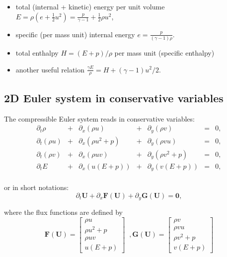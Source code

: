 \documentclass{article}
\begin{document}
\begin{itemize}
\item total (internal + kinetic) energy per unit volume $E = \rho \left( e + \frac{1}{2} u^2 \right) = \frac{p}{\gamma-1} + \frac{1}{2} \rho u^2$,
\item specific (per mass unit) internal energy $e=\frac{p}{(\gamma-1)\rho}$.
\item total enthalpy $H = (E + p)/\rho$ per mass unit (specific enthalpy)
\item another useful relation $\frac{\gamma E}{\rho}=H+(\gamma-1)u^2/2$.
\end{itemize}


\subsection*{2D Euler system in conservative variables}
The compressible Euler system reads in conservative variables:\\
\begin{equation}
  \begin{array}{ccccccc}
    \partial_t \rho & + & \partial_x(\rho u) & + & \partial_y(\rho v) & = & 0,\\
    \partial_t (\rho u) & + & \partial_x(\rho u^2+p) & + & \partial_y(\rho v u) & = & 0,\\
    \partial_t (\rho v) & + & \partial_x(\rho u v) & + & \partial_y(\rho v^2+p) & = & 0,\\
    \partial_t E & + & \partial_x (u(E+p)) & + & \partial_y (v(E+p)) & = & 0,\\
  \end{array}
\end{equation}

or in short notations:
\begin{equation*}
  \partial_t \mathbf{U} + \partial_x \mathbf{F(U)} + \partial_y \mathbf{G(U)} = \mathbf{0},
\end{equation*}

where the flux functions are defined by
\begin{equation}
  \mathbf{F(U)} = \left [
  \begin{array}{c}
    \rho u \\
    \rho u^2 + p \\
    \rho u v \\
    u (E + p)
  \end{array} \right]
  \;\; ,
  \mathbf{G(U)} = \left [
  \begin{array}{c}
    \rho v \\
    \rho v u \\
    \rho v^2 + p \\
    v (E + p)
  \end{array} \right]
\end{equation}
\end{document}
